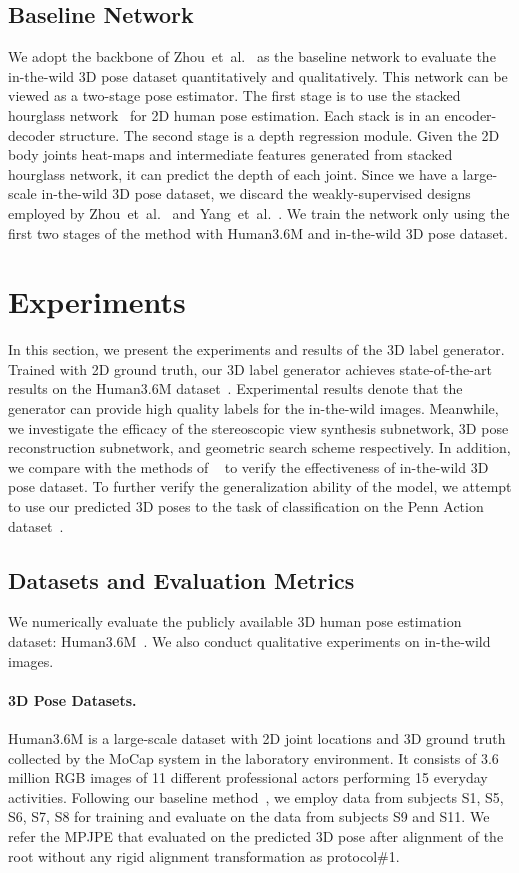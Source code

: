 \documentclass[10pt,twocolumn,letterpaper]{article}
\def\etal{et~al.\xspace}
\begin{document}
\subsection{Baseline Network}
We adopt the backbone of Zhou~\etal~\cite{zhou2017towards} as the baseline network to evaluate the in-the-wild 3D pose dataset quantitatively and qualitatively.
This network can be viewed as a two-stage pose estimator.
The first stage is to use the stacked hourglass network~\cite{newell2016stacked} for 2D human pose estimation.
Each stack is in an encoder-decoder structure.
The second stage is a depth regression module.
Given the 2D body joints heat-maps and intermediate features generated from stacked hourglass network, it can predict the depth of each joint.
Since we have a large-scale in-the-wild 3D pose dataset, we discard the weakly-supervised designs employed by Zhou~\etal~\cite{zhou2017towards} and Yang~\etal~\cite{yang20183d}.
We train the network only using the first two stages of the method with Human3.6M and in-the-wild 3D pose dataset.


\section{Experiments}

In this section, we present the experiments and results of the 3D label generator.
Trained with 2D ground truth, our 3D label generator achieves state-of-the-art results on the Human3.6M dataset~\cite{h36m_pami}.
Experimental results denote that the generator can provide high quality labels for the in-the-wild images.
Meanwhile, we investigate the efficacy of the stereoscopic view synthesis subnetwork, 3D pose reconstruction subnetwork, and geometric search scheme respectively.
In addition, we compare with the methods of ~\cite{zhou2017towards,yang20183d} to verify the effectiveness of in-the-wild 3D pose dataset.
To further verify the generalization ability of the model, we attempt to use our predicted 3D poses to the task of classification on the Penn Action dataset~\cite{zhang2013actemes}.
\subsection{Datasets and Evaluation Metrics}
We numerically evaluate the publicly available 3D human pose estimation dataset: Human3.6M~\cite{h36m_pami}.
We also conduct qualitative experiments on in-the-wild images.
\paragraph{3D Pose Datasets.}\vspace{-4mm}
Human3.6M is a large-scale dataset with 2D joint locations and 3D ground truth collected by the MoCap system in the laboratory environment. 
It consists of 3.6 million RGB images of 11 different professional actors performing 15 everyday activities.
Following our baseline method~\cite{zhou2017towards}, we employ data from subjects S1, S5, S6, S7, S8 for training and evaluate on the data from subjects S9 and S11.
We refer the MPJPE that evaluated on the predicted 3D pose after alignment of the root without any rigid alignment transformation as protocol\#1.
\end{document}
